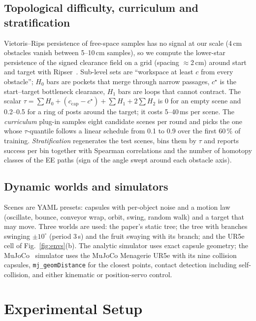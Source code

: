 \documentclass[conference]{IEEEtran}
\begin{document}
\subsection{Topological difficulty, curriculum and stratification}
Vietoris--Rips persistence of free-space samples has no signal at our scale (4\,cm obstacles vanish between 5--10\,cm samples), so we compute the lower-star persistence of the signed clearance field on a grid (spacing $\approx$2\,cm) around start and target with Ripser~\cite{bauer2021ripser}. Sub-level sets are ``workspace at least $c$ from every obstacle''; $H_0$ bars are pockets that merge through narrow passages, $c^\star$ is the start--target bottleneck clearance, $H_1$ bars are loops that cannot contract. The scalar $\tau=\sum H_0+(c_{\mathrm{cap}}-c^\star)+\sum H_1+2\sum H_2$ is 0 for an empty scene and 0.2--0.5 for a ring of posts around the target; it costs 5--40\,ms per scene. The \emph{curriculum} plug-in samples eight candidate scenes per round and picks the one whose $\tau$-quantile follows a linear schedule from 0.1 to 0.9 over the first 60\,\% of training. \emph{Stratification} regenerates the test scenes, bins them by $\tau$ and reports success per bin together with Spearman correlations and the number of homotopy classes of the EE paths (sign of the angle swept around each obstacle axis).

\subsection{Dynamic worlds and simulators}
Scenes are YAML presets: capsules with per-object noise and a motion law (oscillate, bounce, conveyor wrap, orbit, swing, random walk) and a target that may move. Three worlds are used: the paper's static tree; the tree with branches swinging $\pm10^\circ$ (period 3\,s) and the fruit swaying with its branch; and the UR5e cell of Fig.~\ref{fig:envs}(b). The analytic simulator uses exact capsule geometry; the MuJoCo~\cite{todorov2012mujoco} simulator uses the MuJoCo Menagerie UR5e with its nine collision capsules, \texttt{mj\_geomDistance} for the closest points, contact detection including self-collision, and either kinematic or position-servo control.

\section{Experimental Setup}
\end{document}
